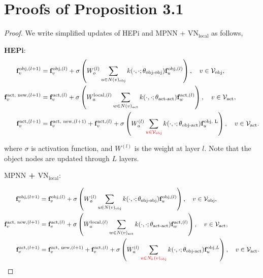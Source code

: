 \section{Proofs of Proposition 3.1}
\label{app_proof}

\begin{proof}
We write simplified updates of HEPi and $\text{MPNN}$ + $\text{VN}_\text{local}$ as follows,

{\bf HEPi}:
\begin{equation}
\begin{aligned}
\mathbf{f}_v^{\text{obj}, (l+1)} &= \mathbf{f}_v^{\text{obj},(l)}  + \sigma \left(W^{(l)}_o \sum_{u \in N(v)_\text{obj}} k(\cdot, \cdot; \theta_\text{obj-obj}) \mathbf{f}_u^{\text{obj},(l)} \right), \quad v \in {\mathcal{V}}_\text{obj}, \\
\mathbf{f}_v^{\text{act, new}, (l+1)} &=  \mathbf{f}_v^{\text{act}, (l)} + \sigma \left(W_a^{\text{local}, (l)} \sum_{w \in N(v)_\text{act}} k(\cdot, \cdot; \theta_\text{act-act}) \mathbf{f}_w^{\text{act}, (l)} \right), \quad v \in {\mathcal{V}}_\text{act}, \\
\mathbf{f}_v^{\text{act}, (l+1)} &= \mathbf{f}_v^{\text{act, new}, (l+1)} +  \mathbf{f}_v^{\text{act},(l)} + \sigma \left(W_{a}^{(l)} \sum_{{\color{red}u \in {\cal V}_\text{obj}}} k(\cdot, \cdot; \theta_\text{obj-act}) \mathbf{f}_u^{\text{obj, L}} \right), \quad v \in {\mathcal{V}}_\text{act}.
\end{aligned}
\label{app_hepi_update}
\end{equation}

where $\sigma$ is activation function, and $W^{(l)}$ is the weight at layer $l$. Note that the object nodes are updated through $L$ layers.

{\bf $\text{MPNN}$ + $\text{VN}_\text{local}$}:

\begin{equation}
\begin{aligned}
\mathbf{f}_v^{\text{obj}, (l+1)} &= \mathbf{f}_v^{\text{obj},(l)}  +\sigma \left(W^{(l)}_o \sum_{u \in N(v)_\text{obj}} k(\cdot, \cdot; \theta_\text{obj-obj}) \mathbf{f}_u^{\text{obj},(l)} \right), \quad v \in {\mathcal{V}}_\text{obj}, \\
\mathbf{f}_v^{\text{act, new}, (l+1)} &=  \mathbf{f}_v^{\text{act}, (l)} + \sigma \left(W_a^{\text{local}, (l)}  \sum_{w \in N(v)_\text{act}} k(\cdot, \cdot; \theta_\text{act-act}) \mathbf{f}_w^{\text{act}, (l)} \right), \quad v \in {\mathcal{V}}_\text{act}, \\
\mathbf{f}_v^{\text{act}, (l+1)} &= \mathbf{f}_v^{\text{act, new}, (l+1)} +  \mathbf{f}_v^{\text{act},(l)} + \sigma \left(W_{a}^{(l)} \sum_{{\color{red}u \in N_k(v)_\text{obj}}} k(\cdot, \cdot; \theta_\text{obj-act}) \mathbf{f}_u^{\text{obj}, L} \right), \quad v \in {\mathcal{V}}_\text{act}.
\end{aligned}
\label{app_mpnn_local_update}
\end{equation}


\end{proof}
